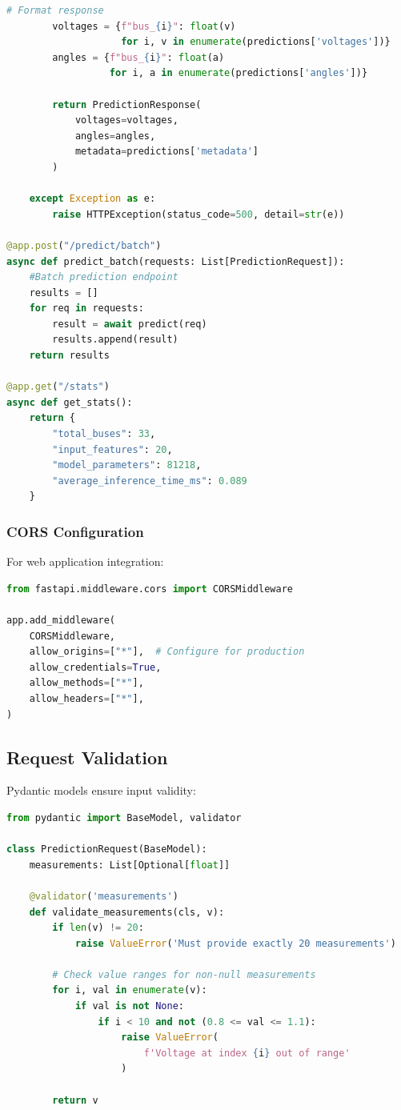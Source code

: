 \documentclass[12pt,a4paper]{report}
\begin{document}
\begin{lstlisting}[language=Python, caption={FastAPI Server Implementation}]
        # Format response
        voltages = {f"bus_{i}": float(v) 
                    for i, v in enumerate(predictions['voltages'])}
        angles = {f"bus_{i}": float(a) 
                  for i, a in enumerate(predictions['angles'])}
        
        return PredictionResponse(
            voltages=voltages,
            angles=angles,
            metadata=predictions['metadata']
        )
        
    except Exception as e:
        raise HTTPException(status_code=500, detail=str(e))

@app.post("/predict/batch")
async def predict_batch(requests: List[PredictionRequest]):
    #Batch prediction endpoint
    results = []
    for req in requests:
        result = await predict(req)
        results.append(result)
    return results

@app.get("/stats")
async def get_stats():
    return {
        "total_buses": 33,
        "input_features": 20,
        "model_parameters": 81218,
        "average_inference_time_ms": 0.089
    }
\end{lstlisting}

\subsubsection{CORS Configuration}

For web application integration:

\begin{lstlisting}[language=Python, caption={CORS Middleware}]
from fastapi.middleware.cors import CORSMiddleware

app.add_middleware(
    CORSMiddleware,
    allow_origins=["*"],  # Configure for production
    allow_credentials=True,
    allow_methods=["*"],
    allow_headers=["*"],
)
\end{lstlisting}

\subsection{Request Validation}

Pydantic models ensure input validity:

\begin{lstlisting}[language=Python, caption={Input Validation}]
from pydantic import BaseModel, validator

class PredictionRequest(BaseModel):
    measurements: List[Optional[float]]
    
    @validator('measurements')
    def validate_measurements(cls, v):
        if len(v) != 20:
            raise ValueError('Must provide exactly 20 measurements')
        
        # Check value ranges for non-null measurements
        for i, val in enumerate(v):
            if val is not None:
                if i < 10 and not (0.8 <= val <= 1.1):
                    raise ValueError(
                        f'Voltage at index {i} out of range'
                    )
        
        return v
\end{lstlisting}
\end{document}

